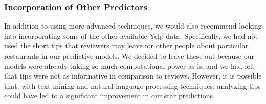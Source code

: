 \documentclass[10pt]{article}
\begin{document}
\subsubsection{Incorporation of Other Predictors} 
In addition to using more advanced techniques, we would also recommend looking into incorporating some of the other available Yelp data. Specifically, we had not used the short tips that reviewers may leave for other people about particular restaurants in our predictive models. We decided to leave these out because our models were already taking so much computational power as is, and we had felt that tips were not as informative in comparison to reviews. However, it is possible that, with text mining and natural language processing techniques, analyzing tips could have led to a significant improvement in our star predictions. 
\end{document}
